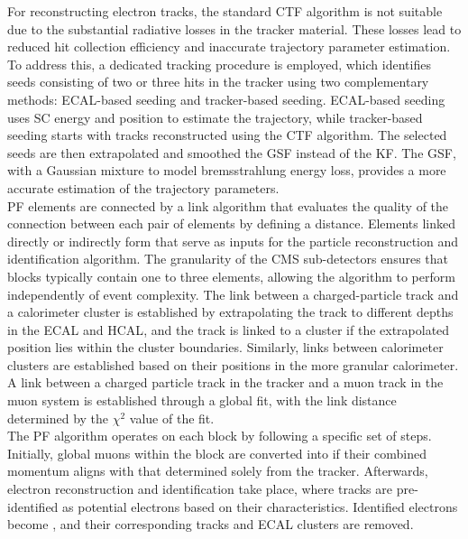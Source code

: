 For reconstructing electron tracks, the standard \ac{CTF} algorithm is not suitable due to the substantial radiative losses in the tracker material. 
These losses lead to reduced hit collection efficiency and inaccurate trajectory parameter estimation. 
To address this, a dedicated tracking procedure is employed, which identifies seeds consisting of two or three hits in the tracker using two complementary methods: \ac{ECAL}-based seeding and tracker-based seeding. 
\ac{ECAL}-based seeding uses SC energy and position to estimate the trajectory, while tracker-based seeding starts with tracks reconstructed using the \ac{CTF} algorithm.
The selected seeds are then extrapolated and smoothed the \ac{GSF} instead of the \ac{KF}. 
The \ac{GSF}, with a Gaussian mixture to model bremsstrahlung energy loss, provides a more accurate estimation of the trajectory parameters. \\

\ac{PF} elements are connected by a link algorithm that evaluates the quality of the connection between each pair of elements by defining a distance.
Elements linked directly or indirectly form  that serve as inputs for the particle reconstruction and identification algorithm. 
The granularity of the \ac{CMS} sub-detectors ensures that blocks typically contain one to three elements, allowing the algorithm to perform independently of event complexity. 
The link between a charged-particle track and a calorimeter cluster is established by extrapolating the track to different depths in the \ac{ECAL} and \ac{HCAL}, and the track is linked to a cluster if the extrapolated position lies within the cluster boundaries. 
Similarly, links between calorimeter clusters are established based on their positions in the more granular calorimeter. 
A link between a charged particle track in the tracker and a muon track in the muon system is established through a global fit, with the link distance determined by the $\chi^2$ value of the fit. \\

The \ac{PF} algorithm operates on each block by following a specific set of steps. 
Initially, global muons within the block are converted into  if their combined momentum aligns with that determined solely from the tracker. 
Afterwards, electron reconstruction and identification take place, where tracks are pre-identified as potential electrons based on their characteristics. 
Identified electrons become , and their corresponding tracks and \ac{ECAL} clusters are removed. \\

